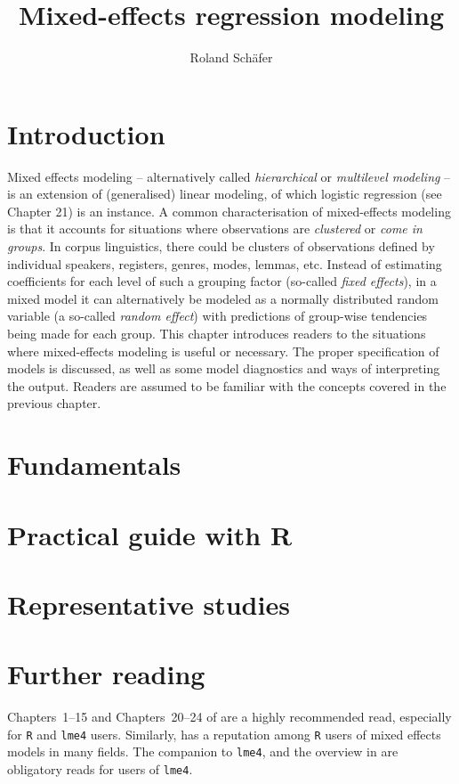 \documentclass[graybox]{svmult}
\title{Mixed-effects regression modeling}
\author{Roland Schäfer}
\institute{Roland Schäfer \at Deutsche und niederländische Philologie, Freie Universität Berlin \email{roland.schaefer@fu-berlin.de}}
\begin{document}
       

\maketitle

\section{Introduction}
\label{sec:introduction}

Mixed effects modeling -- alternatively called \textit{hierarchical} or \textit{multilevel modeling} -- is an extension of (generalised) linear modeling, of which logistic regression (see Chapter 21) is an instance.
A common characterisation of mixed-effects modeling is that it accounts for situations where observations are \textit{clustered} or \textit{come in groups}.
In corpus linguistics, there could be clusters of observations defined by individual speakers, registers, genres, modes, lemmas, etc.
Instead of estimating coefficients for each level of such a grouping factor (so-called \textit{fixed effects}), in a mixed model it can alternatively be modeled as a normally distributed random variable (a so-called \textit{random effect}) with predictions of group-wise tendencies being made for each group.
This chapter introduces readers to the situations where mixed-effects modeling is useful or necessary.
The proper specification of models is discussed, as well as some model diagnostics and ways of interpreting the output.
Readers are assumed to be familiar with the concepts covered in the previous chapter.

\section{Fundamentals}
\label{sec:fundamentals}




\section{Practical guide with R}
\label{sec:practicalguidewithr}



\newpage
\section{Representative studies}



\section{Further reading}
\label{sec:furtherreading}

Chapters~1--15 and Chapters~20--24 of \citet{GelmanHill2006} are a highly recommended read, especially for \texttt{R} and \texttt{lme4} users.
Similarly, \citet{ZuurEa2009} has a reputation among \texttt{R} users of mixed effects models in many fields.
The companion to \texttt{lme4}, \citet{Bates2010} and the overview in \citet{BatesEa2015} are obligatory reads for users of \texttt{lme4}.


\end{document}

